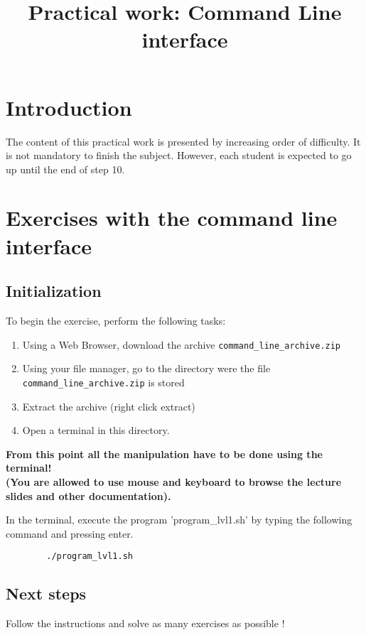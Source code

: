 \documentclass[10pt,a4paper]{article}
\title{Practical work: Command Line interface \\
}
\begin{document}
	
	\maketitle
	
	\section{Introduction}
	The content of this practical work is presented by increasing order of difficulty. It is not mandatory to finish the subject. However, each student is expected to go up until the end of step 10.
	

	
	\section{Exercises with the command line interface}
	
	\subsection{Initialization}
	To begin the exercise, perform the following tasks:
 	\begin{enumerate}
		\item Using a Web Browser, download the archive \texttt{command\_line\_archive.zip} 
		\item Using your file manager, go to the directory were the file  \texttt{command\_line\_archive.zip} is stored
		\item Extract the archive (right click extract)
		\item Open a terminal in this directory.
		
	\end{enumerate}

\begin{center}
\bf	From this point all the manipulation have to be done using the terminal! \\
 (You are allowed to use mouse and keyboard to browse the lecture slides and other documentation).
\end{center}

	In the terminal, execute the program 'program\_lvl1.sh' by typing the following command and pressing enter.
	\begin{verbatim}
		./program_lvl1.sh
	\end{verbatim}
	\EndAccSupp{}
	
	\subsection{Next steps}
	
	Follow the instructions and solve as many exercises as possible !
	
	
\end{document}
